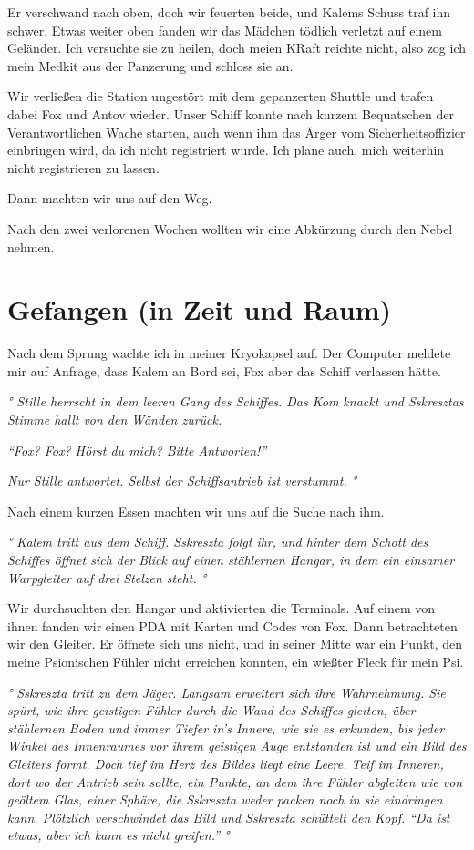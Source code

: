 \documentclass[11pt]{article}
\begin{document}
Er verschwand nach oben, doch wir feuerten beide, und Kalems Schuss traf
ihn schwer. Etwas weiter oben fanden wir das Mädchen tödlich verletzt
auf einem Geländer. Ich versuchte sie zu heilen, doch meien KRaft
reichte nicht, also zog ich mein Medkit aus der Panzerung und schloss
sie an.

Wir verließen die Station ungestört mit dem gepanzerten Shuttle und
trafen dabei Fox und Antov wieder. Unser Schiff konnte nach kurzem
Bequatschen der Verantwortlichen Wache starten, auch wenn ihm das Ärger
vom Sicherheitsoffizier einbringen wird, da ich nicht registriert wurde.
Ich plane auch, mich weiterhin nicht registrieren zu lassen.

Dann machten wir uns auf den Weg.

Nach den zwei verlorenen Wochen wollten wir eine Abkürzung durch den
Nebel nehmen.

\section{Gefangen (in Zeit und Raum)}

Nach dem Sprung wachte ich in meiner Kryokapsel auf. Der Computer
meldete mir auf Anfrage, dass Kalem an Bord sei, Fox aber das Schiff
verlassen hätte.

\emph{° Stille herrscht in dem leeren Gang des Schiffes. Das Kom knackt
und Sskresztas Stimme hallt von den Wänden zurück.}

\emph{``Fox? Fox? Hörst du mich? Bitte Antworten!''}

\emph{Nur Stille antwortet. Selbst der Schiffsantrieb ist verstummt. °}

Nach einem kurzen Essen machten wir uns auf die Suche nach ihm.

\emph{° Kalem tritt aus dem Schiff. Sskreszta folgt ihr, und hinter dem
Schott des Schiffes öffnet sich der Blick auf einen stählernen Hangar,
in dem ein einsamer Warpgleiter auf drei Stelzen steht. °}

Wir durchsuchten den Hangar und aktivierten die Terminals. Auf einem von
ihnen fanden wir einen PDA mit Karten und Codes von Fox. Dann
betrachteten wir den Gleiter. Er öffnete sich uns nicht, und in seiner
Mitte war ein Punkt, den meine Psionischen Fühler nicht erreichen
konnten, ein wießter Fleck für mein Psi.

\emph{° Sskreszta tritt zu dem Jäger. Langsam erweitert sich ihre
Wahrnehmung. Sie spürt, wie ihre geistigen Fühler durch die Wand des
Schiffes gleiten, über stählernen Boden und immer Tiefer in's Innere,
wie sie es erkunden, bis jeder Winkel des Innenraumes vor ihrem
geistigen Auge entstanden ist und ein Bild des Gleiters formt. Doch tief
im Herz des Bildes liegt eine Leere. Teif im Inneren, dort wo der
Antrieb sein sollte, ein Punkte, an dem ihre Fühler abgleiten wie von
geöltem Glas, einer Sphäre, die Sskreszta weder packen noch in sie
eindringen kann. Plötzlich verschwindet das Bild und Sskreszta schüttelt
den Kopf. ``Da ist etwas, aber ich kann es nicht greifen.'' °}
\end{document}
